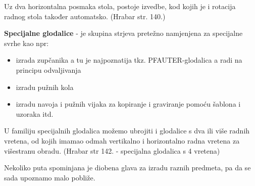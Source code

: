 \documentclass[a4paper,12pt]{article}
\numberwithin{figure}{section}
\begin{document}
Uz dva horizontalna posmaka stola, postoje izvedbe, kod kojih je i rotacija radnog stola također automatsko. (Hrabar str. 140.)\par
\textbf{Specijalne glodalice} - je skupina strjeva pretežno namjenjena za specijalne svrhe kao npr:
\begin{itemize}
\item izrada zupčanika a tu je najpoznatija tkz. PFAUTER-glodalica a radi na principu odvaljivanja
\item izradu pužnih kola
\item izradu navoja i pužnih vijaka
za kopiranje i graviranje pomoću šablona i uzoraka itd.
\end{itemize}
U familiju specijalnih glodalica možemo ubrojiti i glodalice s dva ili više radnih vretena, od kojih imamao odmah vertikalno i horizontalno radna vretena za višestranu obradu. (Hrabar str 142. - specijalna glodalica s 4 vretena)\par
Nekoliko puta spominjana je diobena glava za izradu raznih predmeta, pa da se sada upoznamo malo pobliže.
\end{document}
